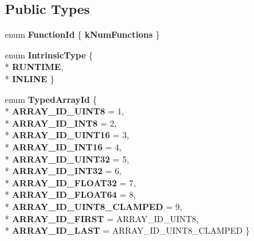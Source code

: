 \subsection*{Public Types}
\begin{DoxyCompactItemize}
\item 
enum {\bfseries Function\+Id} \{ {\bfseries k\+Num\+Functions}
 \}\hypertarget{classv8_1_1internal_1_1_runtime_a013b8c319f323c8e688a6f598845835a}{}\label{classv8_1_1internal_1_1_runtime_a013b8c319f323c8e688a6f598845835a}

\item 
enum {\bfseries Intrinsic\+Type} \{ \\*
{\bfseries R\+U\+N\+T\+I\+ME}, 
\\*
{\bfseries I\+N\+L\+I\+NE}
 \}\hypertarget{classv8_1_1internal_1_1_runtime_a9794fd24ae9e4731fe6679eca11fef02}{}\label{classv8_1_1internal_1_1_runtime_a9794fd24ae9e4731fe6679eca11fef02}

\item 
enum {\bfseries Typed\+Array\+Id} \{ \\*
{\bfseries A\+R\+R\+A\+Y\+\_\+\+I\+D\+\_\+\+U\+I\+N\+T8} = 1, 
\\*
{\bfseries A\+R\+R\+A\+Y\+\_\+\+I\+D\+\_\+\+I\+N\+T8} = 2, 
\\*
{\bfseries A\+R\+R\+A\+Y\+\_\+\+I\+D\+\_\+\+U\+I\+N\+T16} = 3, 
\\*
{\bfseries A\+R\+R\+A\+Y\+\_\+\+I\+D\+\_\+\+I\+N\+T16} = 4, 
\\*
{\bfseries A\+R\+R\+A\+Y\+\_\+\+I\+D\+\_\+\+U\+I\+N\+T32} = 5, 
\\*
{\bfseries A\+R\+R\+A\+Y\+\_\+\+I\+D\+\_\+\+I\+N\+T32} = 6, 
\\*
{\bfseries A\+R\+R\+A\+Y\+\_\+\+I\+D\+\_\+\+F\+L\+O\+A\+T32} = 7, 
\\*
{\bfseries A\+R\+R\+A\+Y\+\_\+\+I\+D\+\_\+\+F\+L\+O\+A\+T64} = 8, 
\\*
{\bfseries A\+R\+R\+A\+Y\+\_\+\+I\+D\+\_\+\+U\+I\+N\+T8\+\_\+\+C\+L\+A\+M\+P\+ED} = 9, 
\\*
{\bfseries A\+R\+R\+A\+Y\+\_\+\+I\+D\+\_\+\+F\+I\+R\+ST} = A\+R\+R\+A\+Y\+\_\+\+I\+D\+\_\+\+U\+I\+N\+T8, 
\\*
{\bfseries A\+R\+R\+A\+Y\+\_\+\+I\+D\+\_\+\+L\+A\+ST} = A\+R\+R\+A\+Y\+\_\+\+I\+D\+\_\+\+U\+I\+N\+T8\+\_\+\+C\+L\+A\+M\+P\+ED
 \}\hypertarget{classv8_1_1internal_1_1_runtime_a80bc0fbf6603396cf71c90d7f40b4ece}{}\label{classv8_1_1internal_1_1_runtime_a80bc0fbf6603396cf71c90d7f40b4ece}

\end{DoxyCompactItemize}
